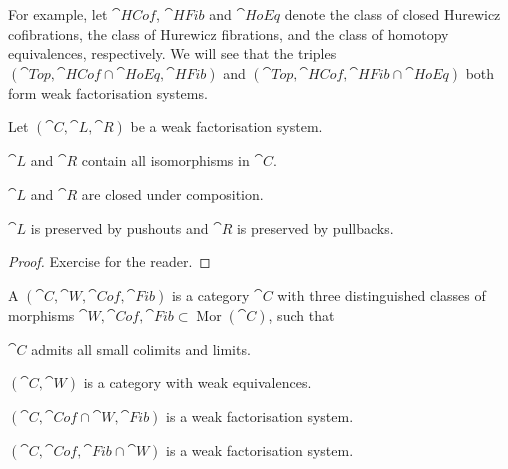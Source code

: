 For example, let $\cat{HCof}$, $\cat{HFib}$ and $\cat{HoEq}$
denote the class of closed Hurewicz cofibrations,
the class of Hurewicz fibrations, and the class of homotopy equivalences, respectively.
We will see that the triples
$(\cat{Top},\cat{HCof}\cap\cat{HoEq},\cat{HFib})$
and
$(\cat{Top},\cat{HCof},\cat{HFib}\cap\cat{HoEq})$
both form weak factorisation systems.

\begin{proposition}
    Let $(\cat{C},\cat{L},\cat{R})$ be a weak factorisation system.
    \begin{itms}
        \item $\cat{L}$ and $\cat{R}$ contain all isomorphisms in $\cat{C}$.
        \item $\cat{L}$ and $\cat{R}$ are closed under composition.
        \item $\cat{L}$ is preserved by pushouts and $\cat{R}$ is preserved by pullbacks.
    \end{itms}
\end{proposition}

\begin{proof}
    Exercise for the reader.
\end{proof}

\begin{definition}
    A  $(\cat{C},\cat{W},\cat{Cof},\cat{Fib})$
    is a category $\cat{C}$ with
    three distinguished classes of morphisms
    $\cat{W},\cat{Cof},\cat{Fib}\subset\operatorname{Mor}(\cat{C})$,
    such that
    \begin{itms}
        \item $\cat{C}$ admits all small colimits and limits.
        \item $(\cat{C},\cat{W})$ is a category with weak equivalences.
        \item $(\cat{C},\cat{Cof}\cap\cat{W},\cat{Fib})$ is a weak factorisation system.
        \item $(\cat{C},\cat{Cof},\cat{Fib}\cap\cat{W})$ is a weak factorisation system.
    \end{itms}
\end{definition}

